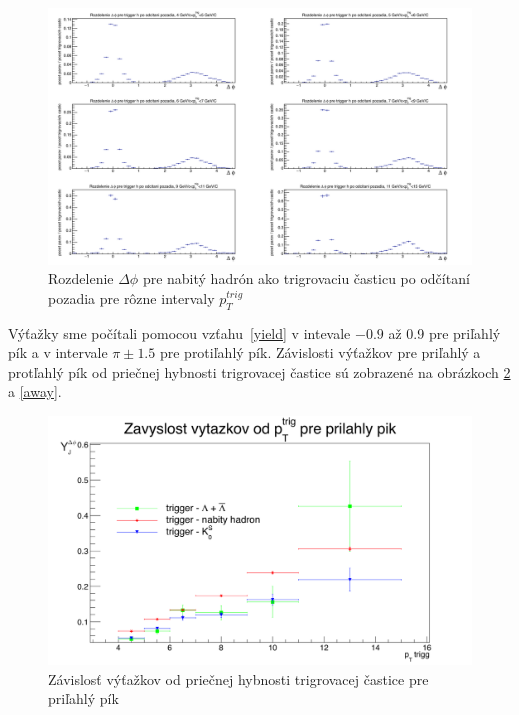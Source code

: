 \documentclass[thesismargins, thesislinespacing]{rnthesis}
\begin{document}
\begin{figure}[hbtp!]
	\centering
	\includegraphics[width=\textwidth]{./Obrazky_praca/DeltaPhiHH.png}
	\caption{Rozdelenie $\Delta \phi$ pre nabitý hadrón ako trigrovaciu časticu po odčítaní pozadia pre rôzne intervaly $p_T^{trig}$}
	\label{hh}
\end{figure}
\newpage

Výťažky sme počítali pomocou vzťahu~\ref{yield} v intevale $-0.9$ až 0.9 pre priľahlý pík a v intervale $\pi\pm1.5$ pre protiľahlý pík. Závislosti výťažkov pre priľahlý a protľahlý pík od priečnej hybnosti trigrovacej častice sú zobrazené na obrázkoch \ref{near} a \ref{away}.

\begin{figure}[hbtp!]
	\centering
	\includegraphics[width=\textwidth]{./Obrazky_praca/vytazok_near.png}
	\caption{Závislosť výťažkov od priečnej hybnosti trigrovacej častice pre priľahlý pík}
	\label{near}
\end{figure}
\end{document}
